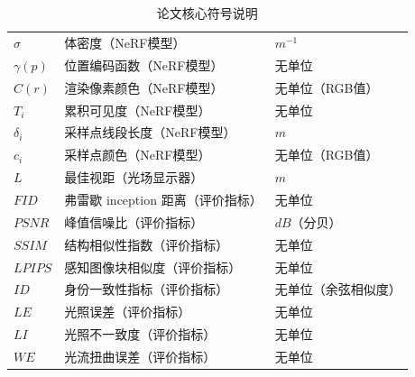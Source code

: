 \begin{nomenclature}
\begin{table}[htbp]
\begin{tabular}{>{\centering\arraybackslash}m{4cm} >{\centering\arraybackslash}m{6cm} >{\centering\arraybackslash}m{3cm}}
      $\sigma$      & 体密度（NeRF模型）                    & $m^{-1}$ \\
      $\gamma(p)$   & 位置编码函数（NeRF模型）              & 无单位 \\
      $\hat{C}(r)$  & 渲染像素颜色（NeRF模型）              & 无单位（RGB值） \\
      $T_i$        & 累积可见度（NeRF模型）                & 无单位 \\
      $\delta_i$    & 采样点线段长度（NeRF模型）            & $m$ \\
      $c_i$        & 采样点颜色（NeRF模型）                & 无单位（RGB值） \\
      $L$          & 最佳视距（光场显示器）                & $m$ \\
      $FID$        & 弗雷歇 inception 距离（评价指标）      & 无单位 \\
      $PSNR$       & 峰值信噪比（评价指标）                & $dB$（分贝） \\
      $SSIM$       & 结构相似性指数（评价指标）            & 无单位 \\
      $LPIPS$      & 感知图像块相似度（评价指标）          & 无单位 \\
      $ID$          & 身份一致性指标（评价指标）            & 无单位（余弦相似度） \\
      $LE$          & 光照误差（评价指标）                  & 无单位 \\
      $LI$          & 光照不一致度（评价指标）              & 无单位 \\
      $WE$          & 光流扭曲误差（评价指标）              & 无单位 \\
      \bottomrule
    \end{tabular}
    \caption{论文核心符号说明}
    \label{tab:nomenclature}
 \end{table}
\end{nomenclature}
